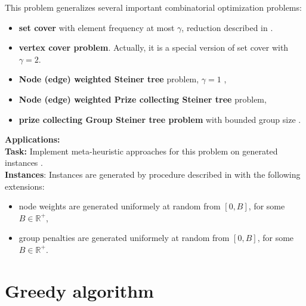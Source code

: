 \documentclass[a4paper,11pt]{article}
\begin{document}
This problem generalizes several important combinatorial optimization problems:
\begin{itemize}
    \item \textbf{set cover} with element frequency at most $\gamma$, reduction described in \cite{gargPolylogarithmicApproximationAlgorithm2000}.
    \item \textbf{vertex cover problem}. Actually, it is a special version of set cover with $\gamma = 2$.
    \item \textbf{Node (edge) weighted Steiner tree} problem, $\gamma = 1$  \cite{kleinNearlyBestPossibleApproximation1995},
    \item \textbf{Node (edge) weighted Prize collecting Steiner tree} problem,
    \item \textbf{prize collecting Group Steiner tree problem} with bounded group size \cite{glicksmanApproximationAlgorithmsGroup2008}.
\end{itemize}

\noindent\textbf{Applications:} \cite{faustPathwayDiscoveryMetabolic2010,sunPhysaruminspiredPrizecollectingSteiner2016,zhangPrioritizationCancerDriver2022}\\
\textbf{Task:} Implement meta-heuristic approaches for this problem on generated instances \cite{matijevicGeneralVariableNeighborhood2022}.\\
\textbf{Instances}: Instances are generated by procedure described in \cite{matijevicGeneralVariableNeighborhood2022} with the following extensions:
\begin{itemize}
    \item node weights are generated uniformely at random from $[0,B]$, for some $B\in\mathbb{R}^+$,
    \item group penalties are generated uniformely at random from $[0,B]$, for some $B\in\mathbb{R}^+$.
\end{itemize}

\section{Greedy algorithm}
\end{document}
